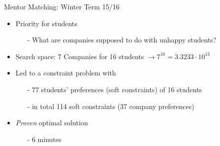 \begin{frame}[fragile]{Mentor Matching: Winter Term 15/16}
\begin{itemize}
\item Priority for \alert{students}
\begin{itemize}
\item[-] What are companies supposed to do with unhappy students?
\end{itemize}
\item Search space: 7 Companies for 16 students $\rightarrow 7^{16} = 3.3233 \cdot 10^{13}$
\vspace*{2ex}
\item Led to a constraint problem with
\begin{itemize}
\item[-] 77 students' preferences (soft constraints) of 16 students
\item[-] in total 114 soft constraints (37 company preferences) 
\end{itemize}

\vspace*{2ex}

\item \emph{Proven} optimal solution
\begin{itemize}
\item[-] 6 minutes 
\end{itemize}
\end{itemize}
\end{frame}
